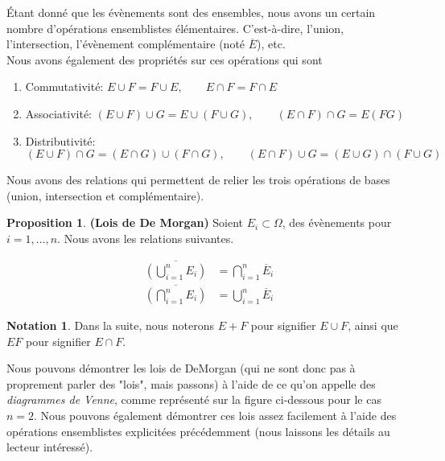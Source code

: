 \documentclass[a4paper,12pt]{report}
\theoremstyle{definition}
\renewcommand{\(}{\left(}
\renewcommand{\)}{\right)}
\renewcommand{\bar}{\overline}
\newtheorem{prop}[thm]{Proposition}
\newtheorem{notat}[thm]{Notation}
\begin{document}
    Étant donné que les évènements sont des ensembles, nous avons un certain nombre d'opérations ensemblistes élémentaires. C'est-à-dire, l'union, l'intersection, l'évènement complémentaire (noté $\bar{E}$), etc. \\
    Nous avons également des propriétés sur ces opérations qui sont 
    \begin{enumerate}[label= (\roman*)]
        \item Commutativité: $E \cup F = F \cup E, \qquad E\cap F = F\cap E$
        \item Associativité: $(E\cup F)\cup G = E\cup (F \cup G), \qquad (E\cap F)\cap G = E(FG)$
        \item Distributivité: $(E\cup F)\cap G = (E\cap G) \cup (F\cap G), \qquad (E\cap F)\cup G = (E \cup G)\cap (F\cup G)$
    \end{enumerate}
    
    Nous avons des relations qui permettent de relier les trois opérations de bases (union, intersection et complémentaire).
    
    \begin{leftbar}
    \begin{prop}
        \textbf{(Lois de De Morgan)} Soient $E_i \subset \Omega$, des évènements pour $i = 1, \ldots, n$. Nous avons les relations suivantes.
        
        \begin{align*}
            \bar{\left(\bigcup_{i = 1}^n E_i\right)} &= \bigcap_{i = 1}^n \bar{E}_i\\
            \bar{\left(\bigcap_{i = 1}^n E_i\right)} &= \bigcup_{i = 1}^n \bar{E}_i
        \end{align*}
    \end{prop}
    \end{leftbar}
    
    \begin{notat}
        Dans la suite, nous noterons $E+F$ pour signifier $E\cup F$, ainsi que $EF$ pour signifier $E\cap F$.
    \end{notat}
    
    Nous pouvons démontrer les lois de DeMorgan (qui ne sont donc pas à proprement parler des "lois", mais passons) à l'aide de ce qu'on appelle des \textit{diagrammes de Venne}, comme représenté sur la figure ci-dessous pour le cas $n = 2$. Nous pouvons également démontrer ces lois assez facilement à l'aide des opérations ensemblistes explicitées précédemment (nous laissons les détails au lecteur intéressé).
    
\end{document}
